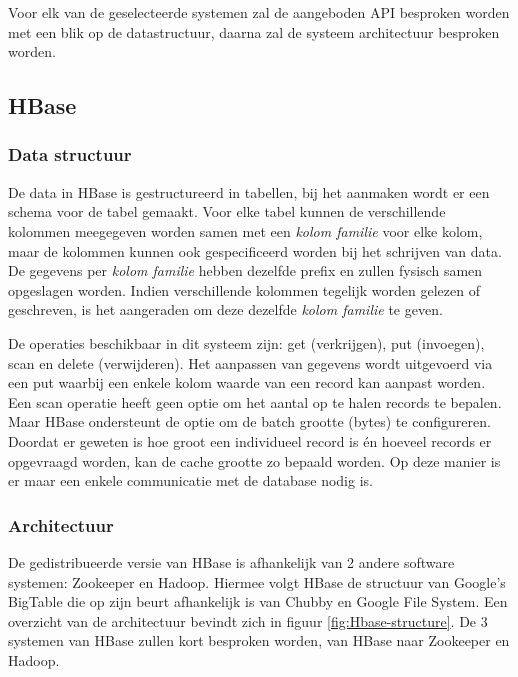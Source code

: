 Voor elk van de geselecteerde systemen zal de aangeboden API besproken worden met een blik op de datastructuur, daarna zal de systeem architectuur besproken worden. 

\subsection{HBase}

\subsubsection{Data structuur\cite{george2011hbase}}
De data in HBase is gestructureerd in tabellen, bij het aanmaken wordt er een schema voor de tabel gemaakt. Voor elke tabel kunnen de verschillende kolommen meegegeven worden samen met een \textit{kolom familie} voor elke kolom, maar de kolommen kunnen ook gespecificeerd worden bij het schrijven van data. De gegevens per \textit{kolom familie} hebben dezelfde prefix en zullen fysisch samen opgeslagen worden. Indien verschillende kolommen tegelijk worden gelezen of geschreven, is het aangeraden om deze dezelfde \textit{kolom familie} te geven. 

De operaties beschikbaar in dit systeem zijn: get (verkrijgen), put (invoegen), scan en delete (verwijderen). Het aanpassen van gegevens wordt uitgevoerd via een put waarbij een enkele kolom waarde van een record kan aanpast worden. Een scan operatie heeft geen optie om het aantal op te halen records te bepalen. Maar HBase ondersteunt de optie om de batch grootte (bytes) te configureren. Doordat er geweten is hoe groot een individueel record is én hoeveel records er opgevraagd worden, kan de cache grootte zo bepaald worden. Op deze manier is er maar een enkele communicatie met de database nodig is. 

\subsubsection{Architectuur\cite{george2011hbase}}
De gedistribueerde versie van HBase is afhankelijk van 2 andere software systemen: Zookeeper\cite{hunt2010zookeeper} en Hadoop\cite{borthakur2007hadoop}. Hiermee volgt HBase de structuur van Google's BigTable\cite{chang2008bigtable} die op zijn beurt afhankelijk is van Chubby\cite{burrows2006chubby} en Google File System\cite{ghemawat2003google}. Een overzicht van de architectuur bevindt zich in figuur \ref{fig:Hbase-structure}. De 3 systemen van HBase zullen kort besproken worden, van HBase naar Zookeeper en Hadoop. 

